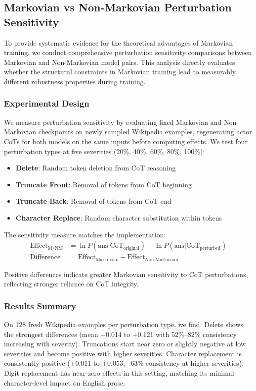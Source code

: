 \documentclass{article} %
\begin{document}
\subsection{Markovian vs Non-Markovian Perturbation Sensitivity}\label{subsec:markovian_sensitivity}

To provide systematic evidence for the theoretical advantages of Markovian training, we conduct comprehensive perturbation sensitivity comparisons between Markovian and Non-Markovian model pairs. This analysis directly evaluates whether the structural constraints in Markovian training lead to measurably different robustness properties during training.

\subsubsection{Experimental Design}
We measure perturbation sensitivity by evaluating fixed Markovian and Non-Markovian checkpoints on newly sampled Wikipedia examples, regenerating actor CoTs for both models on the same inputs before computing effects. We test four perturbation types at five severities (20\%, 40\%, 60\%, 80\%, 100\%):
\begin{itemize}
    \item \textbf{Delete}: Random token deletion from CoT reasoning
    \item \textbf{Truncate Front}: Removal of tokens from CoT beginning  
    \item \textbf{Truncate Back}: Removal of tokens from CoT end
    \item \textbf{Character Replace}: Random character substitution within tokens
\end{itemize}

The sensitivity measure matches the implementation:
\begin{align}
\text{Effect}_{\text{M/NM}} &= \ln P(\text{ans}|\text{CoT}_{\text{original}}) - \ln P(\text{ans}|\text{CoT}_{\text{perturbed}}) \\
\text{Difference} &= \text{Effect}_{\text{Markovian}} - \text{Effect}_{\text{Non-Markovian}}
\end{align}

Positive differences indicate greater Markovian sensitivity to CoT perturbations, reflecting stronger reliance on CoT integrity.

\subsubsection{Results Summary}
On 128 fresh Wikipedia examples per perturbation type, we find: Delete shows the strongest differences (mean +0.014 to +0.121 with 52\%--82\% consistency increasing with severity). Truncations start near zero or slightly negative at low severities and become positive with higher severities. Character replacement is consistently positive (+0.011 to +0.053; ~63\% consistency at higher severities). Digit replacement has near-zero effects in this setting, matching its minimal character-level impact on English prose.
\end{document}
